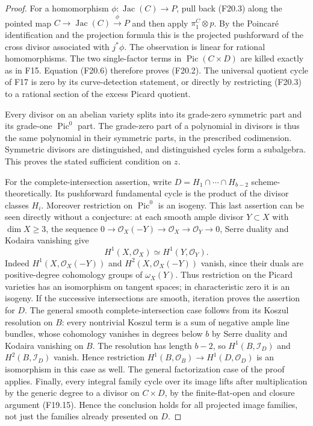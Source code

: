 \documentclass[11pt]{article}
\theoremstyle{remark}\newtheorem{remark}[theorem]{Remark}
\begin{document}
\begin{proof}
For a homomorphism $\phi:\operatorname{Jac}(C)\to P$,
pull back (F20.3) along the pointed map
$C\to\operatorname{Jac}(C)\xrightarrow{\phi}P$ and
then apply $\pi_1^C\otimes p$.  By the Poincar\'e
identification and the projection formula this is
the projected pushforward of the cross divisor
associated with $j^*\phi$.  The observation is
linear for rational homomorphisms.  The two
single-factor terms in $\operatorname{Pic}(C\times D)$
are killed exactly as in F15.  Equation (F20.6)
therefore proves (F20.2).  The universal quotient
cycle of F17 is zero by its curve-detection statement,
or directly by restricting (F20.3) to a rational
section of the excess Picard quotient.

Every divisor on an abelian variety splits into its
grade-zero symmetric part and its grade-one
$\operatorname{Pic}^0$ part.  The grade-zero part of a
polynomial in divisors is thus the same polynomial
in their symmetric parts, in the prescribed
codimension.  Symmetric divisors are distinguished,
and distinguished cycles form a subalgebra.  This
proves the stated sufficient condition on $z$.

For the complete-intersection assertion, write
$D=H_1\cap\cdots\cap H_{b-2}$ scheme-theoretically.
Its pushforward fundamental
cycle is the product of the divisor classes $H_i$.
Moreover restriction on $\operatorname{Pic}^0$ is an
isogeny.  This last assertion can be seen directly
without a conjecture: at each smooth ample divisor
$Y\subset X$ with $\dim X\ge3$, the sequence
$0\to\mathcal O_X(-Y)\to\mathcal O_X\to
\mathcal O_Y\to0$, Serre duality and Kodaira vanishing
give
\[
                            H^1(X,\mathcal O_X)
                              \simeq H^1(Y,\mathcal O_Y).
 \tag{F20.7}
\]
Indeed $H^1(X,\mathcal O_X(-Y))$ and
$H^2(X,\mathcal O_X(-Y))$ vanish, since their duals
are positive-degree cohomology groups of
$\omega_X(Y)$.  Thus restriction on the Picard
varieties has an isomorphism on tangent spaces;
in characteristic zero it is an isogeny.
If the successive intersections are smooth, iteration
proves the assertion for $D$.  The general smooth
complete-intersection case follows from its Koszul
resolution on $B$: every nontrivial Koszul term is
a sum of negative ample line bundles, whose cohomology
vanishes in degrees below $b$ by Serre duality and
Kodaira vanishing on $B$.  The resolution has length
$b-2$, so $H^1(B,\mathcal I_D)$ and
$H^2(B,\mathcal I_D)$ vanish.  Hence restriction
$H^1(B,\mathcal O_B)\to H^1(D,\mathcal O_D)$ is an
isomorphism in this case as well.
The general factorization case of the proof applies.
Finally, every integral family cycle over its image
lifts after multiplication by the generic degree
to a divisor on $C\times D$, by the finite-flat-open
and closure argument (F19.15).  Hence the conclusion
holds for all projected image families, not just
the families already presented on $D$.
\end{proof}
\end{document}
